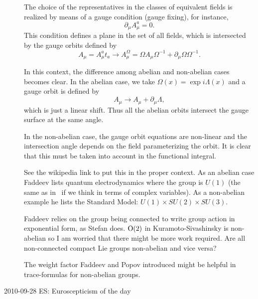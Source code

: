 \begin{description}
\begin{ttfamily}
The choice of the representatives in the classes of equivalent fields is realized
by means of a gauge condition (gauge fixing), for instance,
\[
    \partial_{\mu} A_{\mu}^{a} = 0 .
\]
This condition defines a plane in the set of all fields, which is intersected by the
gauge orbits defined by
\[
    A_{\mu} = A_{\mu}^{a}t_{a} \to A_{\mu}^{\Omega} = \Omega A_{\mu} \Omega^{-1} + \partial_{\mu} \Omega \Omega^{-1} .
\]

In this context, the difference among abelian and non-abelian cases becomes clear. In the abelian case,
we take $\Omega(x) = \exp{i\Lambda(x)}$ and a gauge orbit is defined by
\[
    A_{\mu} \to A_{\mu} + \partial_{\mu} \Lambda ,
\]
which is just a linear shift. Thus all the abelian orbits intersect the gauge surface at the same angle.

In the non-abelian case, the gauge orbit equations are non-linear and the intersection angle depends on the field
parameterizing the orbit. It is clear that this must be taken into account in the functional integral.
\end{ttfamily}

See the wikipedia link to put this in the proper context.
As an abelian case Faddeev lists
quantum electrodynamics where the group is $U(1)$ (the same as in \cLe\ if
we think in terms of complex variables). As a non-abelian example he lists
the Standard Model: $U(1)\times SU(2) \times SU(3)$.

Faddeev relies on the group being connected to write group action in exponential form, as Stefan does.
$\textrm{O}(2)$ in Kuramoto-Sivashinsky is non-abelian so I am worried that there might be more work required.
Are all non-connected compact Lie groups non-abelian and vice versa?

The weight factor Faddeev and Popov introduced might be helpful in trace-formulas for non-abelian groups.

\item[2010-09-28 ES: Euroscepticism of the day]


\end{description}

